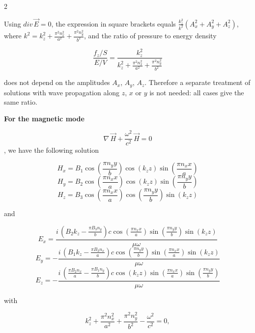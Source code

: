 \documentclass[twoside, 10pt]{article}
\begin{document}
\begin{multicols}{2}

Using \(div\,\vec{E}=0\), the expression in square brackets equals
\(\frac{k_z^2}{k^2}\left(A_x^2+A_y^2+A_z^2\right)\), where \(k^2=k_z^2+\frac{\pi^2n_x^2}{a^2}+\frac{\pi^2n_y^2}{b^2}\),
and the ratio of pressure to energy density

\begin{equation}\frac{f_z/S}{E/V} = \frac{k_{z}^{2}}{k_{z}^{2} + \frac{\pi^{2} n_{x}^{2}}{a^{2}} + \frac{\pi^{2} n_{y}^{2}}{b^{2}}}\end{equation}

does not depend on the amplitudes \(A_x\), \(A_y\), \(A_z\). Therefore a separate treatment of
solutions with wave propagation along \(z\), \(x\) or \(y\) is not needed: all cases give the same
ratio.

\textbf{For the magnetic mode}

\begin{equation}\nabla\,\vec{H} + \frac{\omega^2}{c^2}\,\vec{H} = 0\end{equation}, we have the
following solution

    \[H_{x} = B_{1} \cos\left(\frac{\pi n_{y} y}{b}\right) \cos\left(k_{z} z\right) \sin\left(\frac{\pi n_{x} x}{a}\right)\]
\[H_{y} = B_{2} \cos\left(\frac{\pi n_{x} x}{a}\right) \cos\left(k_{z} z\right) \sin\left(\frac{\pi n_{y} y}{b}\right)\]
\[H_{z} = B_{3} \cos\left(\frac{\pi n_{x} x}{a}\right) \cos\left(\frac{\pi n_{y} y}{b}\right) \sin\left(k_{z} z\right)\]

    and

\[E_{x} = \frac{i \, {\left(B_{2} k_{z} - \frac{\pi B_{3} n_{y}}{b}\right)} c \cos\left(\frac{\pi n_{x} x}{a}\right) \sin\left(\frac{\pi n_{y} y}{b}\right) \sin\left(k_{z} z\right)}{\mu \omega}\]
\[E_{y} = -\frac{i \, {\left(B_{1} k_{z} - \frac{\pi B_{3} n_{x}}{a}\right)} c \cos\left(\frac{\pi n_{y} y}{b}\right) \sin\left(\frac{\pi n_{x} x}{a}\right) \sin\left(k_{z} z\right)}{\mu \omega}\]
\[E_{z} = -\frac{i \, {\left(\frac{\pi B_{2} n_{x}}{a} - \frac{\pi B_{1} n_{y}}{b}\right)} c \cos\left(k_{z} z\right) \sin\left(\frac{\pi n_{x} x}{a}\right) \sin\left(\frac{\pi n_{y} y}{b}\right)}{\mu \omega}\]

    with

\begin{equation}k_{z}^{2} + \frac{\pi^{2} n_{x}^{2}}{a^{2}} + \frac{\pi^{2} n_{y}^{2}}{b^{2}} - \frac{\omega^{2}}{c^{2}} = 0,\end{equation}


\end{multicols}
\end{document}
